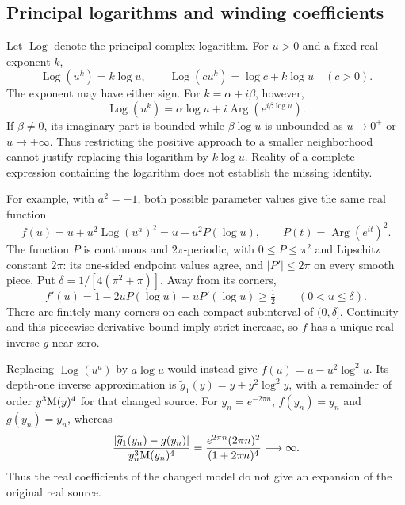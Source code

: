 \subsection{Principal logarithms and winding coefficients}
\label{sec:log-power-normalization}

Let $\operatorname{Log}$ denote the principal complex logarithm. For $u>0$
and a fixed real exponent $k$,
\[
 \operatorname{Log}(u^k)=k\log u,\qquad
 \operatorname{Log}(c u^k)=\log c+k\log u\quad(c>0).
\]
The exponent may have either sign. For $k=\alpha+i\beta$, however,
\begin{equation}
 \operatorname{Log}(u^k)=\alpha\log u+
 i\operatorname{Arg}(e^{i\beta\log u}).
 \label{eq:principal-log-power}
\end{equation}
If $\beta\ne0$, its imaginary part is bounded while $\beta\log u$ is
unbounded as $u\to0^+$ or $u\to+\infty$. Thus restricting the positive
approach to a smaller neighborhood cannot justify replacing this logarithm
by $k\log u$. Reality of a complete expression containing the logarithm
does not establish the missing identity.

For example, with $a^2=-1$, both possible parameter values give the same
real function
\begin{equation}
 f(u)=u+u^2\operatorname{Log}(u^a)^2
     =u-u^2P(\log u),\qquad
 P(t)=\operatorname{Arg}(e^{it})^2.
 \label{eq:winding-source}
\end{equation}
The function $P$ is continuous and $2\pi$-periodic, with $0\le P\le\pi^2$
and Lipschitz constant $2\pi$: its one-sided endpoint values agree, and
$|P'|\le2\pi$ on every smooth piece. Put
$\delta=1/[4(\pi^2+\pi)]$. Away from its corners,
\[
 f'(u)=1-2uP(\log u)-uP'(\log u)\ge\tfrac12
 \qquad(0<u\le\delta).
\]
There are finitely many corners on each compact subinterval of
$(0,\delta]$. Continuity and this piecewise derivative bound imply strict
increase, so $f$ has a unique real inverse $g$ near zero.

Replacing $\operatorname{Log}(u^a)$ by $a\log u$ would instead give
$\widetilde f(u)=u-u^2\log^2u$. Its depth-one inverse approximation is
$\widetilde g_1(y)=y+y^2\log^2y$, with a remainder of order
$y^3\mathrm M(y)^4$ for that changed source. For $y_n=e^{-2\pi n}$,
$f(y_n)=y_n$ and $g(y_n)=y_n$, whereas
\begin{equation}
 \frac{|\widetilde g_1(y_n)-g(y_n)|}{y_n^3\mathrm M(y_n)^4}
 =\frac{e^{2\pi n}(2\pi n)^2}{(1+2\pi n)^4}\longrightarrow\infty.
 \label{eq:winding-false-remainder}
\end{equation}
Thus the real coefficients of the changed model do not give an expansion
of the original real source.

